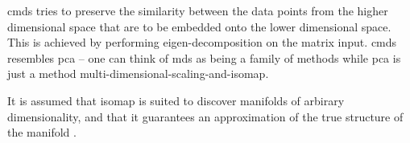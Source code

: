 \gls{cmds} tries to preserve the similarity between the data points from the higher dimensional space that are to be embedded onto the lower dimensional space. This is achieved by performing eigen-decomposition on the matrix input. \gls{cmds} resembles \gls{pca} -- one can think of \gls{mds} as being a family of methods while \gls{pca} is just a method \cite{difference-between-pca-and-mds} multi-dimensional-scaling-and-isomap.



It is assumed that \gls{isomap} is suited to discover manifolds of arbirary dimensionality, and that it guarantees an approximation of the true structure of the manifold \cite{Tennenbaum}.